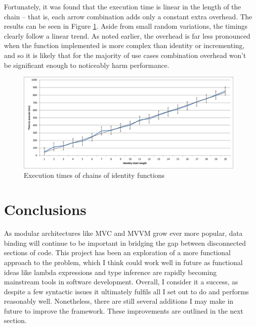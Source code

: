 \documentclass[12pt,twoside,notitlepage]{report}
\begin{document}
Fortunately, it was found that the execution time is linear in the length of the chain -- that is, each arrow combination adds only a constant extra overhead. The results can be seen in Figure \ref{fig:arrow_chaining_overhead}. Aside from small random variations, the timings clearly follow a linear trend. As noted earlier, the overhead is far less pronounced when the function implemented is more complex than identity or incrementing, and so it is likely that for the majority of use cases combination overhead won't be significant enough to noticeably harm performance.

\begin{figure}[!ht]
  \centering
  \includegraphics[width=\textwidth]{fig/IdentityChains.pdf}
  \caption{Execution times of chains of identity functions}
  \label{fig:arrow_chaining_overhead}
\end{figure}


\cleardoublepage



\chapter{Conclusions}

As modular architectures like MVC and MVVM grow ever more popular, data binding will continue to be important in bridging the gap between disconnected sections of code. This project has been an exploration of a more functional approach to the problem, which I think could work well in future as functional ideas like lambda expressions and type inference are rapidly becoming mainstream tools in software development. Overall, I consider it a success, as despite a few syntactic issues it ultimately fulfils all I set out to do and performs reasonably well. Nonetheless, there are still several additions I may make in future to improve the framework. These improvements are outlined in the next section.
\end{document}

